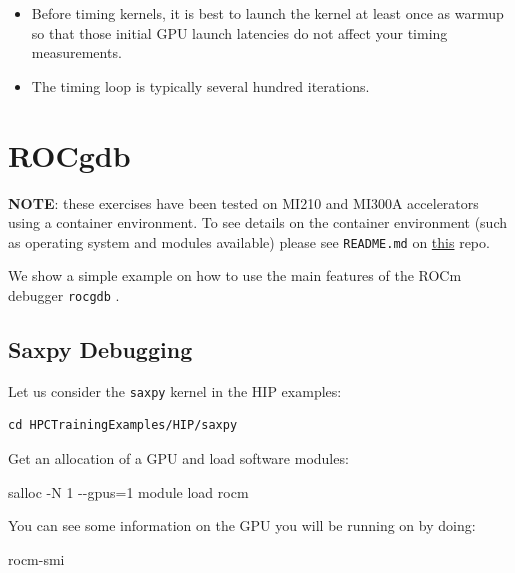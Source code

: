\documentclass[
]{article}
\providecommand{\tightlist}{%
  \setlength{\itemsep}{0pt}\setlength{\parskip}{0pt}}
\let\oldtexttt\texttt
\renewcommand{\texttt}[1]{
  \colorbox{Light}{\oldtexttt{#1}}
}
\newenvironment{Shaded}{}{}
\newcommand{\ExtensionTok}[1]{#1}
\newcommand{\NormalTok}[1]{#1}
\providecommand{\tightlist}{%
  \setlength{\itemsep}{0pt}\setlength{\parskip}{0pt}}
\begin{document}
\begin{itemize}
\tightlist
\item
  Before timing kernels, it is best to launch the kernel at least once
  as warmup so that those initial GPU launch latencies do not affect
  your timing measurements.
\item
  The timing loop is typically several hundred iterations.
\end{itemize}

\hypertarget{rocgdb}{%
\section{ROCgdb}\label{rocgdb}}

\textbf{NOTE}: these exercises have been tested on MI210 and MI300A
accelerators using a container environment. To see details on the
container environment (such as operating system and modules available)
please see \texttt{README.md} on
\href{https://github.com/amd/HPCTrainingDock}{this} repo.

We show a simple example on how to use the main features of the ROCm
debugger \texttt{rocgdb}.

\hypertarget{saxpy-debugging}{%
\subsection{Saxpy Debugging}\label{saxpy-debugging}}

Let us consider the \texttt{saxpy} kernel in the HIP examples:

\begin{verbatim}
cd HPCTrainingExamples/HIP/saxpy
\end{verbatim}

Get an allocation of a GPU and load software modules:

\begin{Shaded}
\begin{Highlighting}[]
\ExtensionTok{salloc}\NormalTok{ {-}N 1 {-}{-}gpus=1}
\ExtensionTok{module}\NormalTok{ load rocm}
\end{Highlighting}
\end{Shaded}

You can see some information on the GPU you will be running on by doing:

\begin{Shaded}
\begin{Highlighting}[]
\ExtensionTok{rocm{-}smi}
\end{Highlighting}
\end{Shaded}
\end{document}
